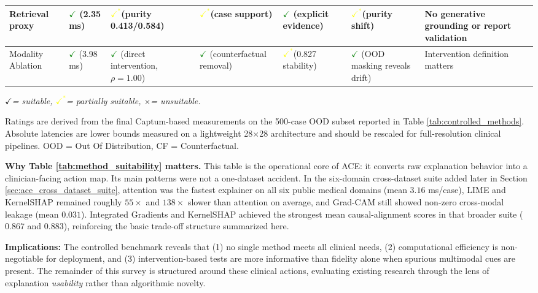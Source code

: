\documentclass[pdflatex,sn-mathphys-num]{sn-jnl}%
\newcommand{\cmark}{\ensuremath{\checkmark}}
\newcommand{\xmark}{\ensuremath{\times}}
\newcommand{\partialcmark}{\textcolor{yellow}{\ensuremath{\checkmark^{*}}}}
\theoremstyle{thmstyleone}%
\theoremstyle{thmstyletwo}%
\theoremstyle{thmstylethree}%
\begin{document}
\begin{table}[h!]
{\begin{tabularx}{\textwidth}{|L{1.7cm}YYYYYL{2.5cm}|}
Retrieval proxy & \textcolor{green}{\cmark} (2.35 ms) & \partialcmark (purity 0.413/0.584) & \partialcmark (case support) & \textcolor{green}{\cmark} (explicit evidence) & \partialcmark (purity shift) & No generative grounding or report validation \\ \hline
Modality Ablation & \textcolor{green}{\cmark} (3.98 ms) & \textcolor{green}{\cmark} (direct intervention, $\rho=1.00$) & \textcolor{green}{\cmark} (counterfactual removal) & \partialcmark (0.827 stability) & \textcolor{green}{\cmark} (OOD masking reveals drift) & Intervention definition matters \\ \hline
\end{tabularx}
\par}
\textit{\cmark = suitable, \partialcmark = partially suitable, \xmark = unsuitable.}\newline

{\footnotesize
Ratings are derived from the final Captum-based measurements on the 500-case OOD subset reported in Table \ref{tab:controlled_methods}. Absolute latencies are lower bounds measured on a lightweight 28$\times$28 architecture and should be rescaled for full-resolution clinical pipelines. OOD = Out Of Distribution, CF = Counterfactual.}
\end{table}


\textbf{Why Table \ref{tab:method_suitability} matters.} This table is the operational core of ACE: it converts raw explanation behavior into a clinician-facing action map. Its main patterns were not a one-dataset accident. In the six-domain cross-dataset suite added later in Section \ref{sec:ace_cross_dataset_suite}, attention was the fastest explainer on all six public medical domains (mean $3.16$ ms/case), LIME and KernelSHAP remained roughly $55\times$ and $138\times$ slower than attention on average, and Grad-CAM still showed non-zero cross-modal leakage (mean $0.031$). Integrated Gradients and KernelSHAP achieved the strongest mean causal-alignment scores in that broader suite ($0.867$ and $0.883$), reinforcing the basic trade-off structure summarized here.

\textbf{Implications:} The controlled benchmark reveals that (1) no single method meets all clinical needs, (2) computational efficiency is non-negotiable for deployment, and (3) intervention-based tests are more informative than fidelity alone when spurious multimodal cues are present. The remainder of this survey is structured around these clinical actions, evaluating existing research through the lens of explanation \textit{usability} rather than algorithmic novelty.
\end{document}
